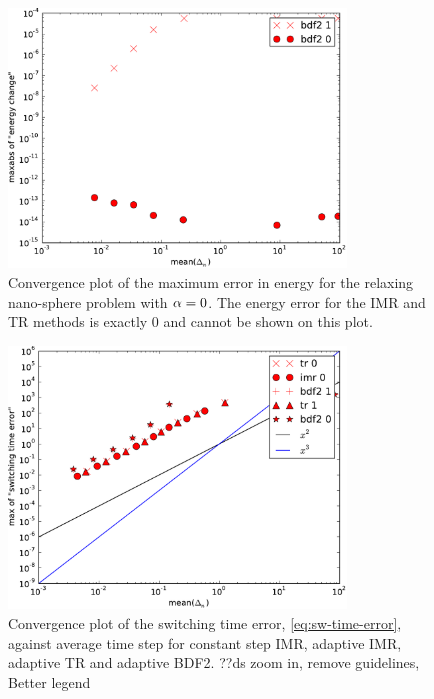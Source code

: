 \begin{figure}
  \centering
  \includegraphics[width=0.8\textwidth]{plots/ode_llg_adaptive_energy/maxabsofenergychangevsmeanofdts}
  \caption{Convergence plot of the maximum error in energy for the relaxing nano-sphere problem with $\alpha = 0$. The energy error for the IMR and TR methods is exactly 0 and cannot be shown on this plot.}
  \label{fig:energy-aimr-ode}
\end{figure}

\begin{figure}
  \centering
  \includegraphics[width=0.8\textwidth]{plots/ode_llg_adaptive_convergence/maxofswitchingtimeerrorvsmeanofdts}
  \caption{Convergence plot of the switching time error, \cref{eq:sw-time-error}, against average time step for constant step IMR, adaptive IMR, adaptive TR and adaptive BDF2. ??ds zoom in, remove guidelines, Better legend}
  \label{fig:llg-ode-convergence-swtime}
\end{figure}


